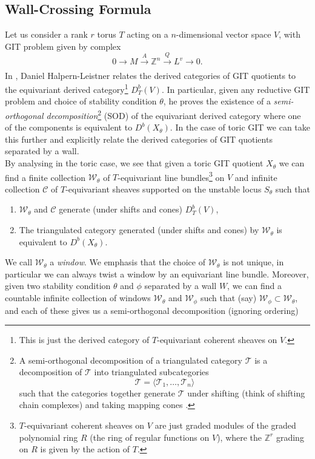 \documentclass[oneside,reqno]{amsart}
\theoremstyle{definition}
\theoremstyle{definition}
\theoremstyle{definition}
\theoremstyle{definition}
\newcommand{\Z}{\mathbb{Z}}
\begin{document}
\subsection{Wall-Crossing Formula}
\label{wallcrossing}
Let us consider a rank $r$ torus $T$ acting on a $n$-dimensional vector space $V$, with GIT problem given by complex
$$
0 \xrightarrow[]{} M \xrightarrow[]{A} \Z^n \xrightarrow[]{Q} L^v \xrightarrow[]{} 0.
$$
In \cite{derivedgit}, Daniel Halpern-Leistner relates the derived categories of GIT quotients to the equivariant derived category\footnote{This is just the derived category of $T$-equivariant coherent sheaves on $V$. } $D^b_T(V)$. In particular, given any reductive GIT problem and choice of stability condition $\theta$, he proves the existence of a \textit{semi-orthogonal decomposition}\footnote{A semi-orthogonal decomposition of a triangulated category $\mathcal{T}$ is a decomposition of $\mathcal{T}$ into triangulated subcategories $$
\mathcal{T} = \langle \mathcal{T}_1, \dots, \mathcal{T}_n \rangle
$$
such that the categories together generate $\mathcal{T}$ under shifting (think of shifting chain complexes) and taking mapping cones \cite[Chapter 1]{huybrechts}. } (SOD) of the equivariant derived category where one of the components is equivalent to $D^b(X_{\theta})$. In the case of toric GIT we can take this further and explicitly relate the derived categories of GIT quotients separated by a wall. \\
\newline
By analysing \cite{derivedgit} in the toric case, we see that given a toric GIT quotient $X_{\theta}$ we can find a finite collection $\mathcal{W}_\theta$ of $T$-equivariant line bundles\footnote{$T$-equivariant coherent sheaves on $V$ are just graded modules of the graded polynomial ring $R$ (the ring of regular functions on $V$), where the $\Z^r$ grading on $R$ is given by the action of $T$.} on $V$ and infinite collection $\mathcal{C}$ of $T$-equivariant sheaves supported on the unstable locus $S_{\theta}$ such that
\begin{enumerate}
    \item $\mathcal{W}_\theta$ and $\mathcal{C}$ generate (under shifts and cones) $D^b_T(V)$,
    \item The triangulated category generated (under shifts and cones) by $\mathcal{W}_{\theta}$ is equivalent to $D^b(X_\theta)$.
\end{enumerate}
We call $\mathcal{W}_\theta$ a \textit{window}. We emphasis that the choice of $\mathcal{W}_{\theta}$ is not unique, in particular we can always twist a window by an equivariant line bundle. Moreover, given two stability condition $\theta$ and $\phi$ separated by a wall $W$, we can find a countable infinite collection of windows $\mathcal{W}_{\theta}$ and $\mathcal{W}_{\phi}$ such that (say) $\mathcal{W}_{\phi} \subset \mathcal{W}_{\theta} $, and each of these gives us a semi-orthogonal decomposition (ignoring ordering)
\end{document}
